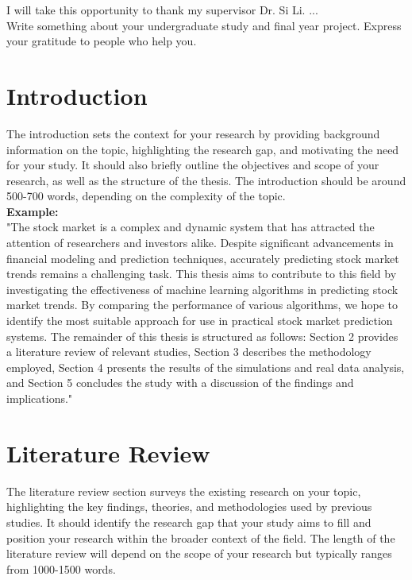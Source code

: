 \documentclass[openany]{book}
\numberwithin{figure}{chapter}
\numberwithin{equation}{chapter}
\begin{document}
I will take this opportunity to thank my supervisor Dr. Si Li. ...\\

Write something about your undergraduate study and final year project. Express your gratitude to people who help you.


\tableofcontents
\listoffigures
\listoftables
\newpage
{}



\chapter{Introduction}

The introduction sets the context for your research by providing background information on the topic, highlighting the research gap, and motivating the need for your study. It should also briefly outline the objectives and scope of your research, as well as the structure of the thesis. The introduction should be around 500-700 words, depending on the complexity of the topic.\\


{\bf Example:}\\

"The stock market is a complex and dynamic system that has attracted the attention of researchers and investors alike. Despite significant advancements in financial modeling and prediction techniques, accurately predicting stock market trends remains a challenging task. This thesis aims to contribute to this field by investigating the effectiveness of machine learning algorithms in predicting stock market trends. By comparing the performance of various algorithms, we hope to identify the most suitable approach for use in practical stock market prediction systems. The remainder of this thesis is structured as follows: Section 2 provides a literature review of relevant studies, Section 3 describes the methodology employed, Section 4 presents the results of the simulations and real data analysis, and Section 5 concludes the study with a discussion of the findings and implications."

\chapter{Literature Review}

The literature review section surveys the existing research on your topic, highlighting the key findings, theories, and methodologies used by previous studies. It should identify the research gap that your study aims to fill and position your research within the broader context of the field. The length of the literature review will depend on the scope of your research but typically ranges from 1000-1500 words.
\end{document}
